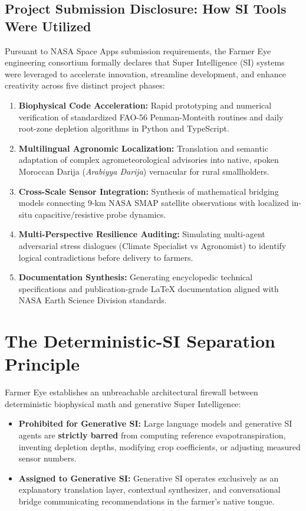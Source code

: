 \documentclass[11pt,a4paper,oneside]{report}
\begin{document}
\subsection{Project Submission Disclosure: How SI Tools Were Utilized}
Pursuant to NASA Space Apps submission requirements, the Farmer Eye engineering consortium formally declares that Super Intelligence (SI) systems were leveraged to accelerate innovation, streamline development, and enhance creativity across five distinct project phases:
\begin{enumerate}[leftmargin=*]
    \item \textbf{Biophysical Code Acceleration:} Rapid prototyping and numerical verification of standardized FAO-56 Penman-Monteith routines and daily root-zone depletion algorithms in Python and TypeScript.
    \item \textbf{Multilingual Agronomic Localization:} Translation and semantic adaptation of complex agrometeorological advisories into native, spoken Moroccan Darija (\textit{Arabiyya Darija}) vernacular for rural smallholders.
    \item \textbf{Cross-Scale Sensor Integration:} Synthesis of mathematical bridging models connecting 9-km NASA SMAP satellite observations with localized in-situ capacitive/resistive probe dynamics.
    \item \textbf{Multi-Perspective Resilience Auditing:} Simulating multi-agent adversarial stress dialogues (Climate Specialist vs Agronomist) to identify logical contradictions before delivery to farmers.
    \item \textbf{Documentation Synthesis:} Generating encyclopedic technical specifications and publication-grade LaTeX documentation aligned with NASA Earth Science Division standards.
\end{enumerate}

\section{The Deterministic-SI Separation Principle}
Farmer Eye establishes an unbreachable architectural firewall between deterministic biophysical math and generative Super Intelligence:
\begin{itemize}[leftmargin=*]
    \item \textbf{Prohibited for Generative SI:} Large language models and generative SI agents are \textbf{strictly barred} from computing reference evapotranspiration, inventing depletion depths, modifying crop coefficients, or adjusting measured sensor numbers.
    \item \textbf{Assigned to Generative SI:} Generative SI operates exclusively as an explanatory translation layer, contextual synthesizer, and conversational bridge communicating recommendations in the farmer's native tongue.
\end{itemize}
\end{document}
